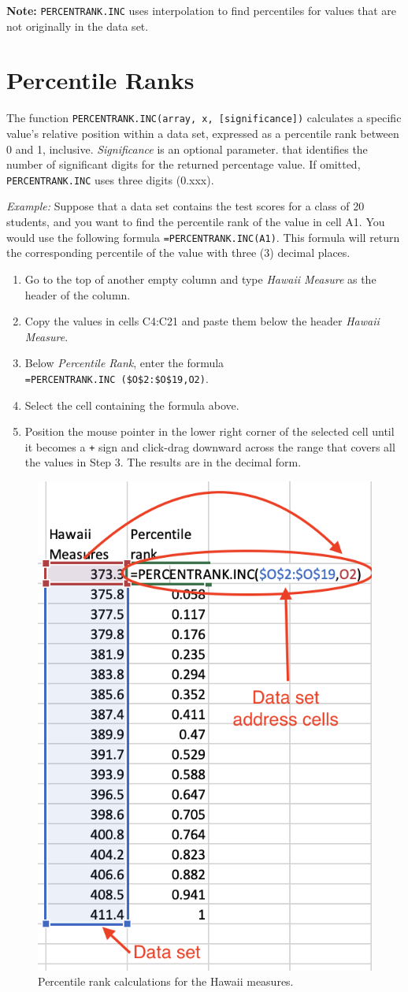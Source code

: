 \documentclass[
]{book}
\providecommand{\tightlist}{%
  \setlength{\itemsep}{0pt}\setlength{\parskip}{0pt}}
\begin{document}
\textbf{Note:} \texttt{PERCENTRANK.INC} uses interpolation to find percentiles for values that are not originally in the data set.

\hypertarget{percentile-ranks}{%
\section{Percentile Ranks}\label{percentile-ranks}}

The function \texttt{PERCENTRANK.INC(array,\ x,\ {[}significance{]})} calculates a specific value's relative position within a data set, expressed as a percentile rank between 0 and 1, inclusive. \emph{Significance} is an optional parameter. that identifies the number of significant digits for the returned percentage value. If omitted, \texttt{PERCENTRANK.INC} uses three digits (0.xxx).

\emph{Example:} Suppose that a data set contains the test scores for a class of 20 students, and you want to find the percentile rank of the value in cell A1. You would use the following formula \texttt{=PERCENTRANK.INC(A1)}. This formula will return the corresponding percentile of the value with three (3) decimal places.

\begin{enumerate}
\def\labelenumi{\arabic{enumi}.}
\tightlist
\item
  Go to the top of another empty column and type \emph{Hawaii Measure} as the header of the column.
\item
  Copy the values in cells C4:C21 and paste them below the header \emph{Hawaii Measure}.
\item
  Below \emph{Percentile Rank}, enter the formula \texttt{=PERCENTRANK.INC\ (\$O\$2:\$O\$19,O2)}.
\item
  Select the cell containing the formula above.
\item
  Position the mouse pointer in the lower right corner of the selected cell until it becomes a \texttt{+} sign and click-drag downward across the range that covers all the values in Step 3. The results are in the decimal form.
\end{enumerate}

\begin{figure}

{\centering \includegraphics[width=0.35\linewidth]{percentranks} 

}

\caption{Percentile rank calculations for the Hawaii measures.}\label{fig:percentranks}
\end{figure}
\end{document}
